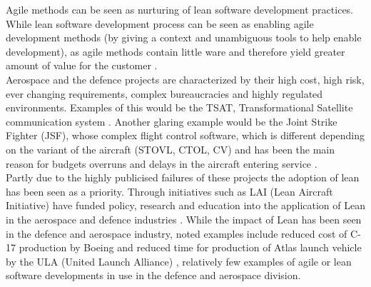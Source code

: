 \documentclass[11pt,twocolumn]{article}
\begin{document}
Agile methods \citep{dingsoyr2012decade} can be seen as nurturing of lean software development practices. While lean software \citep{dybaa2008empirical} development process can be seen as enabling agile development methods (by giving a context and unambiguous tools to help enable development), as agile methods contain little ware and therefore yield greater amount of value for the customer \citep{wang2011comparing}.
\\
Aerospace and the defence projects are characterized by their high cost, high risk, ever changing requirements, complex bureaucracies and highly regulated environments. Examples of this would be the TSAT, Transformational Satellite communication system \citep{payne2010impact}. Another glaring example would be the Joint Strike Fighter (JSF), whose complex flight control software, which is different depending on the variant of the aircraft (STOVL, CTOL, CV) and has been the main reason for budgets overruns and delays in the aircraft entering service \citep{xia2016optimal}.
\\
Partly due to the highly publicised failures of these projects the adoption of lean has been seen as a priority. Through initiatives such as LAI (Lean Aircraft Initiative) have funded policy, research and education into the application of Lean in the aerospace and defence industries \citep{lean1996lean}.  While the impact of Lean has been seen in the defence and aerospace industry, noted examples include reduced cost of C-17 production by Boeing \citep{rebentisch2004lean} and reduced time for production of Atlas launch vehicle by the ULA (United Launch Alliance) \citep{endicott1999space}, relatively few examples of agile or lean software developments in use in the defence and aerospace division. 
\end{document}
